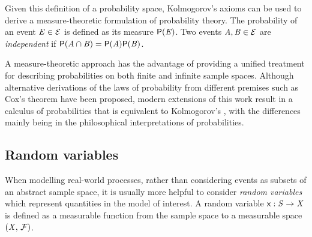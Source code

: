 Given this definition of a probability space, Kolmogorov's axioms \citep{kolmogorov1950foundations} can be used to derive a measure-theoretic formulation of probability theory. The probability of an event $\mathit{E} \in \mathcal{E}$ is defined as its measure $\mathsf{P}(\mathit{E})$. Two events $\mathit{A},\mathit{B} \in \mathcal{E}$ are \emph{independent} if $\mathsf{P}(\mathit{A}\cap\mathit{B}) = \mathsf{P}(\mathit{A})\mathsf{P}(\mathit{B})$.

A measure-theoretic approach has the advantage of providing a unified treatment for describing probabilities on both finite and infinite sample spaces. Although alternative derivations of the laws of probability from different premises such as Cox's theorem \citep{cox1946probability,cox1963algebra} have been proposed, modern extensions of this work result in a calculus of probabilities that is equivalent to Kolmogorov's \citep{terenin2015cox}, with the differences mainly being in the philosophical interpretations of probabilities.

\subsection{Random variables}\label{subsec:random-variables}

When modelling real-world processes, rather than considering events as subsets of an abstract sample space, it is usually more helpful to consider \emph{random variables} which represent quantities in the model of interest. A random variable $\mathsf{x} : \mathit{S} \to \mathit{X}$ is defined as a measurable function from the sample space to a measurable space $(\mathit{X},\,\mathcal{F})$. 

